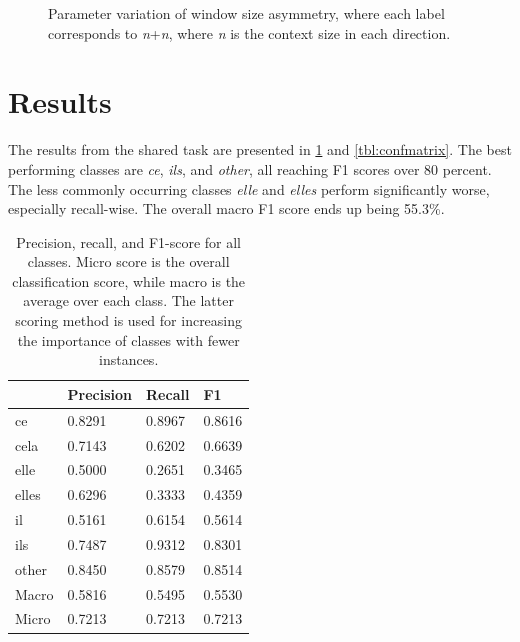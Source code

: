 \documentclass[11pt]{article}
\begin{document}
\begin{figure}[t]
\caption{Parameter variation of window size asymmetry, where each label corresponds to \emph{n}+\emph{n}, where \emph{n} is the context size in each direction.}
\label{figure:winasym}
\end{figure}

\section{Results}

The results from the shared task are presented in \cref{tbl:resultscores} and \cref{tbl:confmatrix}.
The best performing classes are \emph{ce}, \emph{ils}, and \emph{other}, all reaching F1 scores over 80 percent. The less commonly occurring classes \emph{elle} and \emph{elles} perform significantly worse, especially recall-wise.
The overall macro F1 score ends up being 55.3\%.

\begin{table}[t]
\centering
    \begin{tabular}{llll}
          & Precision & Recall  & F1      \\ \midrule
    ce    & 0.8291   & 0.8967 & 0.8616 \\
    cela  & 0.7143   & 0.6202 & 0.6639 \\
    elle  & 0.5000   & 0.2651 & 0.3465 \\
    elles & 0.6296   & 0.3333 & 0.4359 \\
    il    & 0.5161   & 0.6154 & 0.5614 \\
    ils   & 0.7487   & 0.9312 & 0.8301 \\
    other & 0.8450   & 0.8579 & 0.8514 \\
    \midrule
    Macro & 0.5816 & 0.5495 & 0.5530 \\
    Micro & 0.7213 & 0.7213 & 0.7213 \\
    \hline
    \end{tabular}
    \caption{Precision, recall, and F1-score for all classes. Micro score is the overall classification score, while macro is the average over each class. The latter scoring method is used for increasing the importance of classes with fewer instances.}
    \label{tbl:resultscores}
\end{table}
\end{document}
